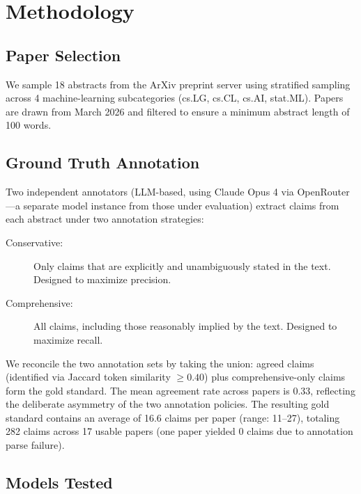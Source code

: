 \documentclass[11pt,a4paper]{article}
\begin{document}
\section{Methodology}
\label{sec:methodology}

\subsection{Paper Selection}
\label{sec:paper-selection}

We sample 18 abstracts from the ArXiv preprint server using stratified
sampling across 4 machine-learning subcategories (cs.LG, cs.CL, cs.AI,
stat.ML).  Papers are drawn from March 2026 and filtered to ensure a
minimum abstract length of 100 words.

\subsection{Ground Truth Annotation}
\label{sec:annotation}

Two independent annotators (LLM-based, using Claude Opus 4 via
OpenRouter---a separate model instance from those under evaluation) extract
claims from each abstract under two annotation strategies:

\begin{description}
  \item[Conservative:] Only claims that are explicitly and unambiguously
    stated in the text.  Designed to maximize precision.
  \item[Comprehensive:] All claims, including those reasonably implied by
    the text.  Designed to maximize recall.
\end{description}

We reconcile the two annotation sets by taking the union: agreed claims
(identified via Jaccard token similarity $\geq 0.40$) plus
comprehensive-only claims form the gold standard.  The mean agreement rate
across papers is 0.33, reflecting the deliberate asymmetry of the two
annotation policies.  The resulting gold standard contains an average of
16.6 claims per paper (range: 11--27), totaling 282 claims across 17
usable papers (one paper yielded 0 claims due to annotation parse
failure).

\subsection{Models Tested}
\label{sec:models}
\end{document}
